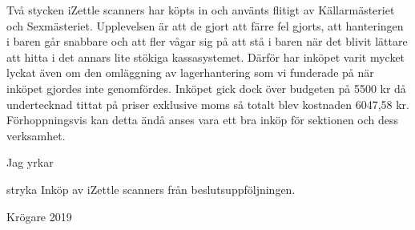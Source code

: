 \documentclass[../_main/handlingar.tex]{subfiles}
\begin{document}

    Två stycken iZettle scanners har köpts in och använts flitigt av Källarmästeriet och Sexmästeriet. Upplevelsen är att de gjort att färre fel gjorts, att hanteringen i baren går snabbare och att fler vågar sig på att stå i baren när det blivit lättare att hitta i det annars lite stökiga kassasystemet. Därför har inköpet varit mycket lyckat även om den omläggning av lagerhantering som vi funderade på när inköpet gjordes inte genomfördes. Inköpet gick dock över budgeten på 5500 kr då undertecknad tittat på priser exklusive moms så totalt blev kostnaden 6047,58 kr. Förhoppningsvis kan detta ändå anses vara ett bra inköp för sektionen och dess verksamhet. 

    Jag yrkar 

\begin{attsatser}
    \att stryka Inköp av iZettle scanners från beslutsuppföljningen.
\end{attsatser}

\begin{signatures}{}
    \signature{Davida Åström}{Krögare 2019}
\end{signatures}
\end{document}
